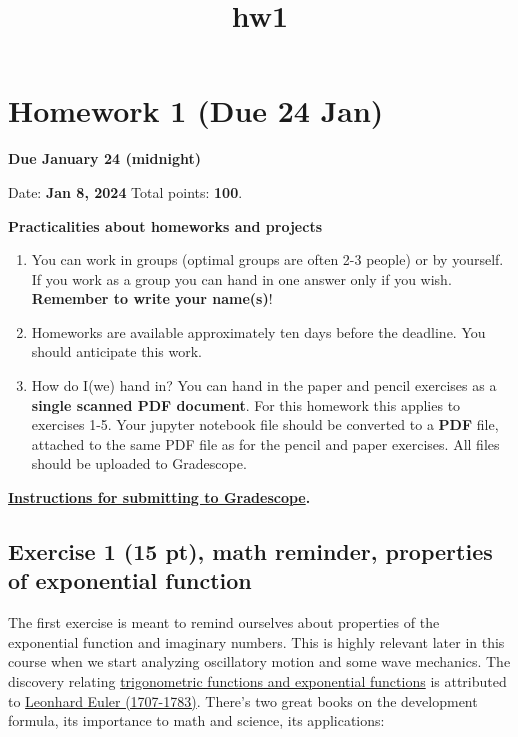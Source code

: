 \documentclass[11pt]{article}
\title{hw1}
\providecommand{\tightlist}{%
      \setlength{\itemsep}{0pt}\setlength{\parskip}{0pt}}
\begin{document}
    
    \maketitle
    
    

    
    \section{Homework 1 (Due 24 Jan)}\label{homework-1-due-24-jan}

\textbf{Due January 24 (midnight)}

Date: \textbf{Jan 8, 2024} Total points: \textbf{100}.

    \textbf{Practicalities about homeworks and projects}

\begin{enumerate}
\def\labelenumi{\arabic{enumi}.}
\tightlist
\item
  You can work in groups (optimal groups are often 2-3 people) or by
  yourself. If you work as a group you can hand in one answer only if
  you wish. \textbf{Remember to write your name(s)}!
\item
  Homeworks are available approximately ten days before the deadline.
  You should anticipate this work.
\item
  How do I(we) hand in? You can hand in the paper and pencil exercises
  as a \textbf{single scanned PDF document}. For this homework this
  applies to exercises 1-5. Your jupyter notebook file should be
  converted to a \textbf{PDF} file, attached to the same PDF file as for
  the pencil and paper exercises. All files should be uploaded to
  Gradescope.
\end{enumerate}

\textbf{\href{../resources/gradescope-submissions.md}{Instructions for
submitting to Gradescope}.}

    \subsection{Exercise 1 (15 pt), math reminder, properties of exponential
function}\label{exercise-1-15-pt-math-reminder-properties-of-exponential-function}

The first exercise is meant to remind ourselves about properties of the
exponential function and imaginary numbers. This is highly relevant
later in this course when we start analyzing oscillatory motion and some
wave mechanics. The discovery relating
\href{https://en.wikipedia.org/wiki/Euler's_formula}{trigonometric
functions and exponential functions} is attributed to
\href{https://en.wikipedia.org/wiki/Leonhard_Euler}{Leonhard Euler
(1707-1783)}. There's two great books on the development formula, its
importance to math and science, its applications:
\end{document}
